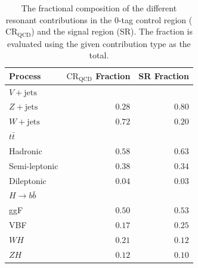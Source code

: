 \begin{table}[htpb]
 \centering
 \caption{The fractional composition of the different resonant contributions in the $0$-tag control region ($\text{CR}_{\text{QCD}}$) and the signal region (SR). The fraction is evaluated using the given contribution type as the total.}
 \begin{tabular}{@{}lrr@{}}
  \toprule
  Process                                   & $\text{CR}_{\text{QCD}}$ Fraction & SR Fraction \\ \midrule
  $V+\text{jets}$                                  &                   &             \\
  \phantom{$V+\text{jets}$\quad} $Z+\text{jets}$ & $0.28$            & $0.80$      \\
  \phantom{$V+\text{jets}$\quad} $W+\text{jets}$ & $0.72$            & $0.20$      \\
  $t\bar{t}$                                &                   &             \\
  \phantom{$t\bar{t}$\quad} Hadronic        & $0.58$            & $0.63$      \\
  \phantom{$t\bar{t}$\quad} Semi-leptonic   & $0.38$            & $0.34$      \\
  \phantom{$t\bar{t}$\quad} Dileptonic      & $0.04$            & $0.03$      \\
  $H \rightarrow b\bar{b}$                                    &                   &             \\
  \phantom{$H \rightarrow b\bar{b}$\quad} ggF                 & $0.50$            & $0.53$      \\
  \phantom{$H \rightarrow b\bar{b}$\quad} VBF                 & $0.17$            & $0.25$      \\
  \phantom{$H \rightarrow b\bar{b}$\quad} $WH$                & $0.21$            & $0.12$      \\
  \phantom{$H \rightarrow b\bar{b}$\quad} $ZH$                & $0.12$            & $0.10$      \\
  \bottomrule
 \end{tabular}
 \label{table:fractional_composition}
\end{table}

